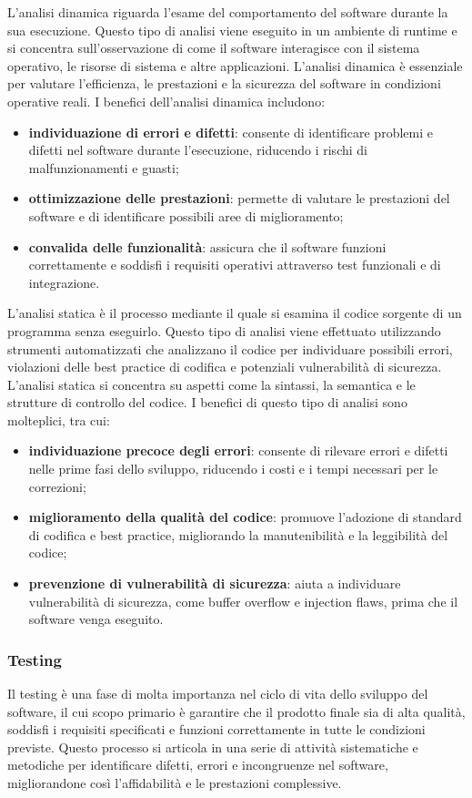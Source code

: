 L'analisi dinamica riguarda l'esame del comportamento del software durante la sua esecuzione. Questo tipo di analisi viene eseguito in un ambiente di runtime e si concentra sull'osservazione di come il software interagisce con il sistema operativo, le risorse di sistema e altre applicazioni. L'analisi dinamica è essenziale per valutare l'efficienza, le prestazioni e la sicurezza del software in condizioni operative reali.
I benefici dell'analisi dinamica includono:
\begin{itemize}
	\item \textbf{individuazione di errori e difetti}: consente di identificare problemi e difetti nel software durante l'esecuzione, riducendo i rischi di malfunzionamenti e guasti;
	\item \textbf{ottimizzazione delle prestazioni}: permette di valutare le prestazioni del software e di identificare possibili aree di miglioramento;
	\item \textbf{convalida delle funzionalità}: assicura che il software funzioni correttamente e soddisfi i requisiti operativi attraverso test funzionali e di integrazione.
\end{itemize}
L'analisi statica è il processo mediante il quale si esamina il codice sorgente di un programma senza eseguirlo. Questo tipo di analisi viene effettuato utilizzando strumenti automatizzati che analizzano il codice per individuare possibili errori, violazioni delle best practice di codifica e potenziali vulnerabilità di sicurezza. L'analisi statica si concentra su aspetti come la sintassi, la semantica e le strutture di controllo del codice. I benefici di questo tipo di analisi sono molteplici, tra cui:
\begin{itemize}
	\item \textbf{individuazione precoce degli errori}: consente di rilevare errori e difetti nelle prime fasi dello sviluppo, riducendo i costi e i tempi necessari per le correzioni;
	\item \textbf{miglioramento della qualità del codice}: promuove l'adozione di standard di codifica e best practice, migliorando la manutenibilità e la leggibilità del codice;
	\item \textbf{prevenzione di vulnerabilità di sicurezza}: aiuta a individuare vulnerabilità di sicurezza, come buffer overflow e injection flaws, prima che il software venga eseguito.
\end{itemize}

\subsubsection{Testing} \label{testing}
Il testing è una fase di molta importanza nel ciclo di vita dello sviluppo del software, il cui scopo primario è garantire che il prodotto finale sia di alta qualità, soddisfi i requisiti specificati e funzioni correttamente in tutte le condizioni previste. Questo processo si articola in una serie di attività sistematiche e metodiche per identificare difetti, errori e incongruenze nel software, migliorandone così l'affidabilità e le prestazioni complessive.

